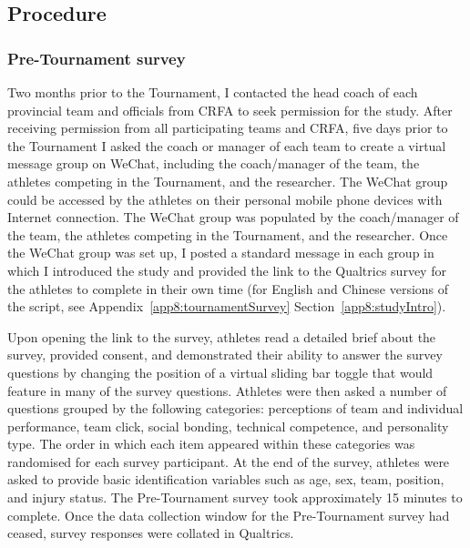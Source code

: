 \begin{CJK}{UTF8}{gbsn}









\subsection{Procedure}

\subsubsection{Pre-Tournament survey}
Two months prior to the Tournament, I contacted the head coach of each provincial team and officials from CRFA to seek permission for the study.  After receiving permission from all participating teams and CRFA, five days prior to the Tournament I asked the coach or manager of each team to create a virtual message group on WeChat, including the coach/manager of the team, the athletes competing in the Tournament, and the researcher.  The WeChat group could be accessed by the athletes on their personal mobile phone devices with Internet connection. The WeChat group was populated by the coach/manager of the team, the athletes competing in the Tournament, and the researcher. Once the WeChat group was set up, I posted a standard message in each group in which I introduced the study and provided the link to the Qualtrics survey for the athletes to complete in their own time (for English and Chinese versions of the script, see Appendix~\ref{app8:tournamentSurvey} Section~\ref{app8:studyIntro}).

Upon opening the link to the survey, athletes read a detailed brief about the survey, provided consent, and demonstrated their ability to answer the survey questions by changing the position of a virtual sliding bar toggle that would feature in many of the survey questions.  Athletes were then asked a number of questions grouped by the following categories: perceptions of team and individual performance, team click, social bonding, technical competence, and personality type. The order in which each item appeared within these categories was randomised for each survey participant. At the end of the survey, athletes were asked to provide basic identification variables such as age, sex, team, position, and injury status.  The Pre-Tournament survey took approximately 15 minutes to complete.  Once the data collection window for the Pre-Tournament survey had ceased, survey responses were collated in Qualtrics.


\end{CJK}

